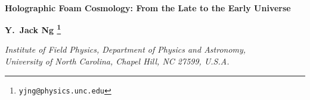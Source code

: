 \documentclass[12pt]{article}
\begin{document}
 

\newcommand{\be}{\begin{equation}}
\newcommand{\ee}{\end{equation}}
\newcommand{\bea}{\begin{eqnarray}}
\newcommand{\eea}{\end{eqnarray}}
\newcommand{\ba}{\begin{array}}
\newcommand{\ea}{\end{array}}
\newcommand{\ben}{\begin{enumerate}}
\newcommand{\een}{\end{enumerate}}
\newcommand{\bi}{\begin{itemize}}
\newcommand{\ei}{\end{itemize}}
\newcommand{\bc}{\begin{center}}
\newcommand{\ec}{\end{center}}
\newcommand{\bfig}{\begin{figure}}
\newcommand{\efig}{\end{figure}}
\newcommand{\bq}{\begin{quotation}}
\newcommand{\eq}{\end{quotation}}
\newcommand{\bt}{\begin{table}}
\newcommand{\et}{\end{table}}
\newcommand{\btab}{\begin{tabular}}
\newcommand{\etab}{\end{tabular}}
\newcommand{\bs}{\begin{slide}}
\newcommand{\es}{\end{slide}}
\newcommand{\nn}{\nonumber}
\newcommand{\eref}[1]{(\ref{#1})}

\newcommand{\AdS}[1]{{\rm AdS}_{#1}}
\newcommand{\pa}{\partial}



\begin{center}
{\Large \bf Holographic Foam Cosmology: From the Late to the Early Universe}
\end{center}

\vskip 1.0cm


\centerline{{\bf
Y.\ Jack Ng
\footnote{\tt yjng@physics.unc.edu}
}}

\vskip 0.5cm

\begin{center}
{\it
Institute of Field Physics, Department of Physics and
Astronomy,\\
University of North Carolina, Chapel Hill, NC 27599, U.S.A.
}
\end{center}
\end{document}

